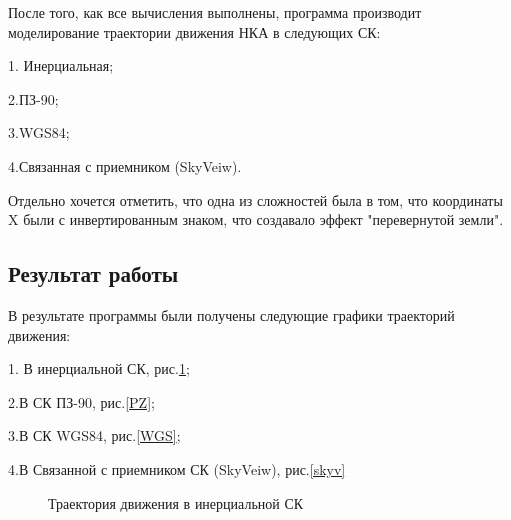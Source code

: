 \documentclass[]{article}
\begin{document}
	
	После того, как все вычисления выполнены, программа производит моделирование траектории движения НКА в следующих СК:
	
	1. Инерциальная;
	
	2.ПЗ-90;
	
	3.WGS84;
	
	4.Связанная с приемником (SkyVeiw).
	
	Отдельно хочется отметить, что одна из сложностей была в том, что координаты X были с инвертированным знаком, что создавало эффект "перевернутой земли".
	
	
	\subsection{Результат работы}
	В результате программы были получены следующие графики траекторий движения:
	
	1. В инерциальной СК, рис.\ref{inertz};
	
	2.В СК ПЗ-90, рис.\ref{PZ};
	
	3.В СК WGS84, рис.\ref{WGS};
	
	4.В Связанной с приемником СК (SkyVeiw), рис.\ref{skyv}
	
	
	
	\begin{figure}[h!]
		
		\caption{Траектория движения в инерциальной СК  }
		\label{inertz}
	\end{figure}
	
\end{document}
